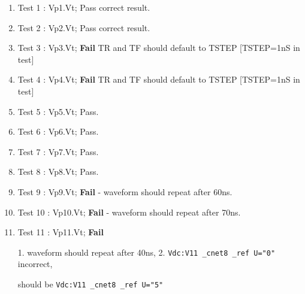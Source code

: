 \begin{enumerate}
 \item Test 1  : Vp1.Vt;  Pass correct result.
 \item Test 2  : Vp2.Vt;  Pass correct result.
 \item Test 3  : Vp3.Vt;  \textbf{Fail} TR and TF should default to TSTEP [TSTEP=1nS in test]
 \item Test 4  : Vp4.Vt; \textbf{ Fail} TR and TF should default to TSTEP [TSTEP=1nS in test]
 \item Test 5  : Vp5.Vt;  Pass.
 \item Test 6  : Vp6.Vt;  Pass.
 \item Test 7  : Vp7.Vt;  Pass.
 \item Test 8  : Vp8.Vt;  Pass.
 \item Test 9  : Vp9.Vt;  \textbf{Fail} - waveform should repeat after 60ns.
 \item Test 10 : Vp10.Vt; \textbf{Fail} - waveform should repeat after 70ns.
 \item \begin{flushleft}
Test 11 : Vp11.Vt;\textbf{ Fail} \end{flushleft}
\begin{flushleft}
 \hspace*{5mm} 1. waveform should repeat after 40ns, 
				\linebreak 
 \hspace*{5mm} 2. \verb|Vdc:V11 _cnet8 _ref U="0"| incorrect, 


 \hspace*{11mm}should be \verb|Vdc:V11 _cnet8 _ref U="5"|                                                                                                         \end{flushleft}
\end{enumerate}


